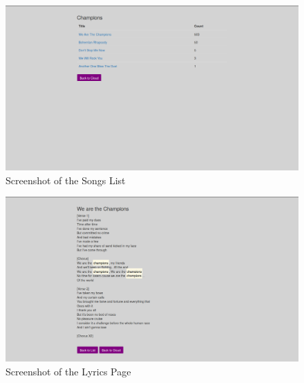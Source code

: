 \documentclass[]{article}
\begin{document}
\begin{figure}[htbp]
\centering
\includegraphics{SongsList.png}
\caption{Screenshot of the Songs List}
\end{figure}

\begin{figure}[htbp]
\centering
\includegraphics{SongPage.png}
\caption{Screenshot of the Lyrics Page}
\end{figure}
\end{document}
